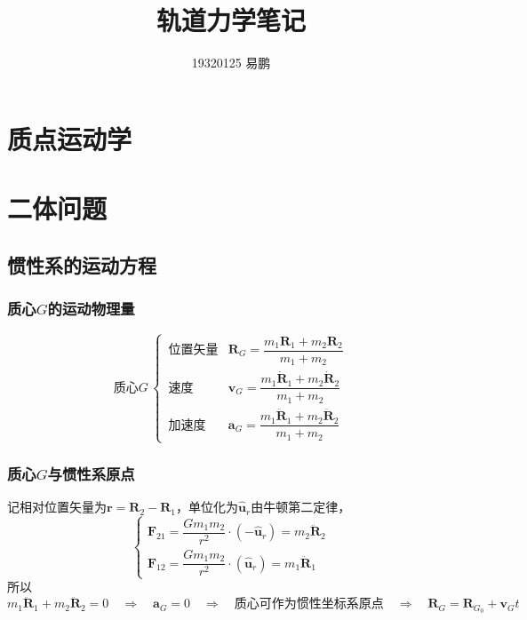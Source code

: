 \documentclass[10pt,a4]{article}
\title{\huge \bf
	轨道力学笔记
}
\author{19320125 \hspace*{1em} 易鹏}
\numberwithin{equation}{section}
\begin{document}
\maketitle

\section{质点运动学}

\section{二体问题}
\subsection{惯性系的运动方程}
\subsubsection{质心$G$的运动物理量}
\begin{equation}
	\mbox{质心} G \, 
	\begin{cases}
		\, \mbox{位置矢量} & \bm{R}_G = \dfrac{m_1 \bm{R}_1 + m_2 \bm{R}_2}{m_1 + m_2}\\[1em]
		\, \mbox{速度} & \bm{v}_G = \dfrac{m_1 \dot{\bm{R}}_1 + m_2 \dot{\bm{R}}_2}{m_1 + m_2}\\[1em]
		\, \mbox{加速度} & \bm{a}_G = \dfrac{m_1 \ddot{\bm{R}}_1 + m_2 \ddot{\bm{R}}_2}{m_1 + m_2}
	\end{cases}
\end{equation}

\subsubsection{质心$G$与惯性系原点}
\hspace*{2em} 记相对位置矢量为$\bm{r} = \bm{R}_2 - \bm{R}_1$，单位化为$\widehat{\bm{u}}_r$由牛顿第二定律，
\begin{equation*}
	\begin{cases}
		\bm{F}_{21} = \dfrac{Gm_1m_2}{r^2}\cdot (-\widehat{\bm{u}}_r) = m_2 \ddot{\bm{R}}_2\\[0.8em]
		\bm{F}_{12} = \dfrac{Gm_1m_2}{r^2}\cdot (\widehat{\bm{u}}_r) = m_1 \ddot{\bm{R}}_1
	\end{cases}
\end{equation*}
所以
\begin{equation}
	m_1 \ddot{\bm{R}}_1 + m_2 \ddot{\bm{R}}_2 = 0 \quad \Rightarrow \quad \bm{a}_G = 0 \quad \Rightarrow \quad \mbox{质心可作为惯性坐标系原点} \quad \Rightarrow \quad \bm{R}_G = \bm{R}_{G_0} + \bm{v}_G t
\end{equation}
\end{document}

